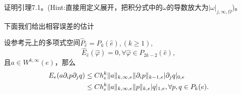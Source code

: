 \begin{exercise}
    证明引理7.1。(Hint:直接用定义展开，把积分式中的$\omega$的导数放大为$|\omega|_{j,\infty,\Omega}$)。
\end{exercise}
下面我们给出相容误差的估计
\begin{theorem}
    设参考元上的多项式空间$\hat{P}_{\hat{e}}=P_{k}(\hat{e}),(k\ge 1),$
    \begin{equation}
        \hat{E}_{\hat{e}}(\hat{\varphi})=0,\forall\hat{\varphi}\in P_{2k-2}(\hat{e}),
    \end{equation}
    且$a\in W^{k,\infty}(e)$，那么
    \begin{equation}
        \begin{aligned}
            E_{e}(a\partial_{i}p\partial_{j}q)&\le Ch_{e}^{k}\|a\|_{k,\infty,e}\|\partial_{i}p\|_{k-1,e}|\partial_{j}q|_{0,e}\\
            &\le Ch_{e}^{k}\|a\|_{k,\infty,e}\|p\|_{k,e}|q|_{1,e},\forall p,q\in P_{k}(e).
        \end{aligned}
    \end{equation}
\end{theorem}
